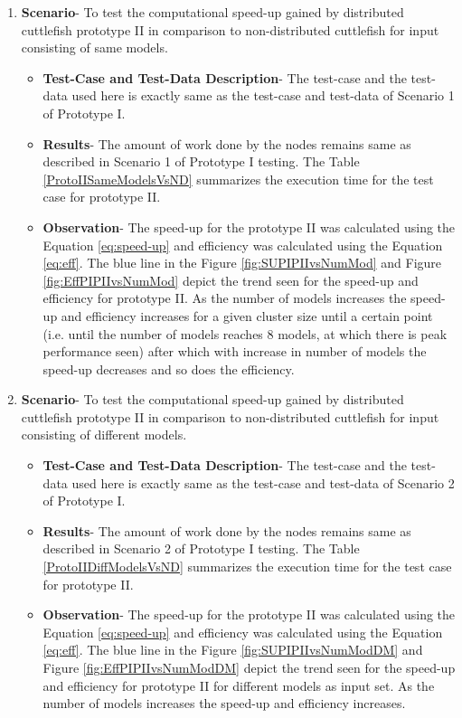 \begin{enumerate}
\item{\textbf{Scenario}}- To test the computational speed-up gained by distributed cuttlefish prototype II in comparison to non-distributed cuttlefish for input consisting of same models.
\begin{itemize}
\item{\textbf{Test-Case and Test-Data Description}}- The test-case and the test-data used here is exactly same as the test-case and test-data of Scenario 1 of Prototype I.
\item{\textbf{Results}}- The amount of work done by the nodes remains same as described in Scenario 1 of Prototype I testing. The Table \ref{ProtoIISameModelsVsND} summarizes the execution time for the test case for prototype II.
\item{\textbf{Observation}}- The speed-up for the prototype II was calculated using the Equation \ref{eq:speed-up} and efficiency was calculated using the Equation \ref{eq:eff}. The blue line in the Figure \ref{fig:SUPIPIIvsNumMod} and Figure \ref{fig:EffPIPIIvsNumMod} depict the trend seen for the speed-up and efficiency for prototype II. As the number of models increases the speed-up and efficiency increases for a given cluster size until a certain point (i.e. until the number of models reaches 8 models, at which there is peak performance seen) after which with increase in number of models the speed-up decreases and so does the efficiency.  
\end{itemize}

\item{\textbf{Scenario}}- To test the computational speed-up gained by distributed cuttlefish prototype II in comparison to non-distributed cuttlefish for input consisting of different models.
\begin{itemize}
\item{\textbf{Test-Case and Test-Data Description}}- The test-case and the test-data used here is exactly same as the test-case and test-data of Scenario 2 of Prototype I.
\item{\textbf{Results}}- The amount of work done by the nodes remains same as described in Scenario 2 of Prototype I testing. The Table \ref{ProtoIIDiffModelsVsND} summarizes the execution time for the test case for prototype II.
\item{\textbf{Observation}}-  The speed-up for the prototype II was calculated using the Equation \ref{eq:speed-up} and efficiency was calculated using the Equation \ref{eq:eff}. The blue line in the Figure \ref{fig:SUPIPIIvsNumModDM} and Figure \ref{fig:EffPIPIIvsNumModDM} depict the trend seen for the speed-up and efficiency for prototype II for different models as input set. As the number of models increases the speed-up and efficiency increases.
\end{itemize}
\end{enumerate}


